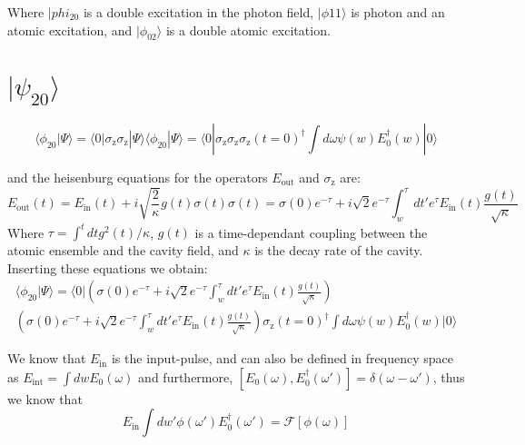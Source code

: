 \documentclass[12pt]{article}
\begin{document}
Where $| phi_{20}$ is a double excitation in the photon field, $| \phi{11} \rangle $ is photon and an atomic excitation, and $ | \phi_{02} \rangle $ is a double atomic excitation. 

\section{ $| \psi_{20} \rangle$}

\begin{equation}
\langle \phi_{20}| \Psi \rangle =\langle 0 | \sigma_\textrm{z} \sigma_\textrm{z} | \Psi \rangle
\langle \phi_{20}| \Psi \rangle =\langle 0 | \sigma_\textrm{z} \sigma_\textrm{z} 
\sigma_\textrm{z}(t=0)^\dagger \int d\omega \psi(w) E_0^\dagger(w) | 0 \rangle
\end{equation}

and the heisenburg equations for the operators $E_\textrm{out}$ and $\sigma_\textrm{z}$ are:
\begin{equation}
E_\textrm{out}(t) = E_\textrm{in}(t) + i \sqrt{\frac{2}{\kappa}} g(t) \sigma(t)
\sigma(t) = \sigma(0) e^{-\tau} + i\sqrt{2} e^{-\tau} \int^\tau_w d t' e^\tau E_\textrm{in}(t) \frac{g(t)}{\sqrt{\kappa}}
\end{equation}
Where $\tau = \int^t dt g^2(t)/\kappa$, $g(t)$ is a time-dependant coupling between the atomic ensemble and the cavity field, and $\kappa$ is the decay rate of the cavity. Inserting these equations we obtain:
\begin{multline}
\langle \phi_{20}| \Psi \rangle =\langle 0 | \left (  \sigma(0) e^{-\tau} + i\sqrt{2} e^{-\tau} \int^\tau_w d t' e^\tau E_\textrm{in}(t) \frac{g(t)}{\sqrt{\kappa}} \right )\\ \left ( \sigma(0) e^{-\tau} + i\sqrt{2} e^{-\tau} \int^\tau_w d t' e^\tau E_\textrm{in}(t) \frac{g(t)}{\sqrt{\kappa}} \right ) \sigma_\textrm{z}(t=0)^\dagger \int d\omega \psi(w) E_0^\dagger(w) | 0 \rangle
\end{multline}

We know that $E_\textrm{in}$ is the input-pulse, and can also be defined in frequency space as $E_\textrm{int} = \int dw E_0(\omega) $ and furthermore, $[E_0(\omega), E_0^\dagger(\omega') ] = \delta(\omega-\omega')$, thus we know that 
\begin{equation}
E_\textrm{in} \int dw' \phi(\omega') E_0^\dagger(\omega') = \mathscr{F}[\phi(\omega)]
\end{equation}
\end{document}
